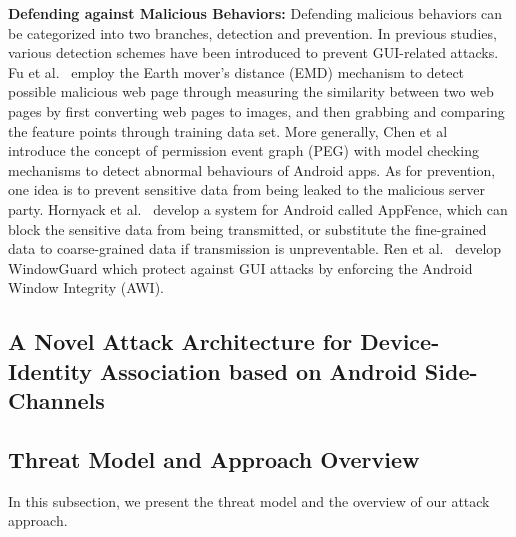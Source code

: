 \documentclass[letterpaper,12pt]{article}
\begin{document}
\textbf{Defending against Malicious Behaviors:} Defending malicious
behaviors can be categorized into two branches, detection and
prevention. In previous studies, various detection schemes have been
introduced to prevent GUI-related attacks. Fu
et al.~\cite{detectpswebsite} employ the Earth mover's distance (EMD)
mechanism to detect possible malicious web page through measuring the
similarity between two web pages by first converting web pages to
images, and then grabbing and comparing the feature points through
training data set. More generally, Chen et al~\cite{peg} introduce the
concept of permission event graph (PEG) with model checking mechanisms
to detect abnormal behaviours of Android apps. As for prevention, one
idea is to prevent sensitive data from being leaked to the malicious
server party. Hornyack et al.~\cite{AppFence} develop a
system for Android called AppFence, which can block the sensitive data
from being transmitted, or substitute the fine-grained data to
coarse-grained data if transmission is unpreventable. Ren
et al.~\cite{Windowguard} develop WindowGuard which protect against GUI
attacks by enforcing the Android Window Integrity (AWI).

   \newpage
   \begin{singlespace}
   \section{A Novel Attack Architecture for Device-Identity Association based on Android Side-Channels}
   \end{singlespace}
   \label{sec:dssnassociate}
   
   \subsection{Threat Model and Approach Overview}\label{sec:dssnthreatapproach}
   In this subsection, we present the threat model and the overview of our attack approach.
\end{document}
